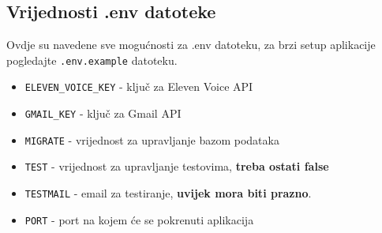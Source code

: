 		\subsection*{Vrijednosti .env datoteke}
			Ovdje su navedene sve mogućnosti za .env datoteku, za brzi setup aplikacije pogledajte \texttt{.env.example} datoteku.
			\begin{itemize}
				\item \texttt{ELEVEN\_VOICE\_KEY} - ključ za Eleven Voice API
				\item \texttt{GMAIL\_KEY} - ključ za Gmail API
				\item \texttt{MIGRATE} - vrijednost za upravljanje bazom podataka
				\item \texttt{TEST} - vrijednost za upravljanje testovima, \textbf{treba ostati false}
				\item \texttt{TESTMAIL} - email za testiranje, \textbf{uvijek mora biti prazno}.
				\item \texttt{PORT} - port na kojem će se pokrenuti aplikacija
			\end{itemize}
		
		\eject
